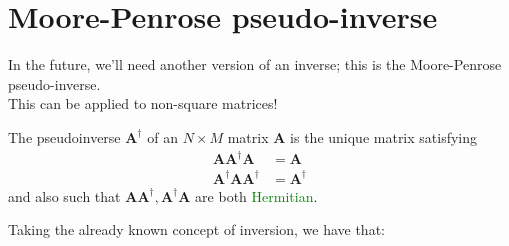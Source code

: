 \documentclass[a4paper, 12pt]{book}
\begin{document}

\section{Moore-Penrose pseudo-inverse}

In the future, we'll need another version of an inverse; this is the Moore-Penrose pseudo-inverse.\\
This can be applied to non-square matrices!

The pseudoinverse $\boldsymbol{A}^\dagger$ of an $N \times M$ matrix $\boldsymbol{A}$ is the unique matrix satisfying
\begin{align}
    \boldsymbol{A}\boldsymbol{A}^\dagger \boldsymbol{A} &= \boldsymbol{A} \tag{B.30} \\
    \boldsymbol{A}^\dagger \boldsymbol{A} \boldsymbol{A}^\dagger &= \boldsymbol{A}^\dagger \tag{B.31}
\end{align}
and also such that $\boldsymbol{A}\boldsymbol{A}^\dagger, \boldsymbol{A}^\dagger \boldsymbol{A}$ are both \textcolor{green}{Hermitian}.

Taking the already known concept of inversion, we have that:
\end{document}
